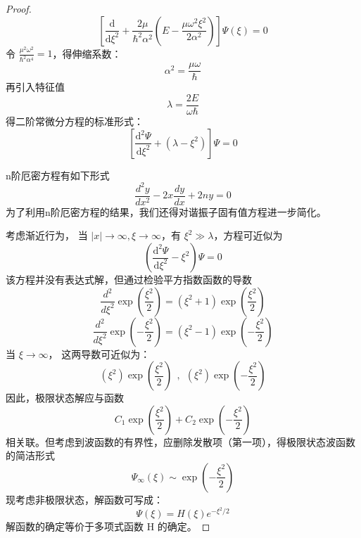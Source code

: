 \begin{proof}
\begin{equation*}
	\left[ \frac{\mathrm{d}}{\mathrm{d} \xi ^2}  + \frac{2\mu}{\hbar ^2 \alpha ^2 } (E- \frac{\mu \omega ^2 \xi ^2}{2 \alpha ^2}  ) \right] \Psi(\xi) =0
\end{equation*}
令 $\frac{\mu ^2 \omega ^2 }{\hbar ^2 \alpha ^ 4} =1$，得伸缩系数：\\
\begin{equation*}
	 \alpha ^2= \frac{\mu\omega}{\hbar}
\end{equation*}
再引入特征值\\
\begin{equation*}
\lambda = \frac{2E}{\omega \hbar}
\end{equation*}
得二阶常微分方程的标准形式：\\
\begin{equation*}
\left[ \frac{\mathrm{d} ^2\Psi}{\mathrm{d} \xi^2} + \left( \lambda - \xi^2 \right) \right] \Psi=0
\end{equation*}
\begin{remark}
n阶厄密方程有如下形式\\
	\begin{equation*}
	\frac{d^2 y}{d x^2} -2x \frac{d y}{d x} +2n y =0 
    \end{equation*}     
为了利用n阶厄密方程的结果，我们还得对谐振子固有值方程进一步简化。\\
\end{remark}
考虑渐近行为， 当 $ |x| \to \infty,  \xi \to \infty$，有 $ \xi ^2  \gg  \lambda $，方程可近似为 \\
\begin{equation*}
	\left(\frac{\mathrm{d} ^2\Psi}{\mathrm{d} \xi^2} - \xi^2 \right) \Psi=0
\end{equation*}
该方程并没有表达式解，但通过检验平方指数函数的导数\\
\begin{equation*}
	\frac{d^2 }{d \xi ^2} \exp(\frac{\xi ^2}{2}) =(\xi ^2 +1)  \exp(\frac{\xi ^2}{2}) 
\end{equation*}    
\begin{equation*}
	\frac{d^2 }{d \xi ^2} \exp( - \frac{\xi ^2}{2}) =(\xi ^2 -1)  \exp( - \frac{\xi ^2}{2}) 
\end{equation*}     
当 $ \xi \to \infty$， 这两导数可近似为：\\
\begin{equation*}
(\xi ^2 )  \exp( \frac{\xi ^2}{2}) ~~, ~~ (\xi ^2 )  \exp( - \frac{\xi ^2}{2}) 
\end{equation*}     
因此，极限状态解应与函数
\begin{equation*}
	C_1  \exp( \frac{\xi ^2}{2}) + C_2   \exp( - \frac{\xi ^2}{2})  
\end{equation*}     
相关联。但考虑到波函数的有界性，应删除发散项（第一项），得极限状态波函数的简洁形式
\begin{equation*}
\Psi_\infty (\xi)  \sim \exp( - \frac{\xi ^2}{2})  
\end{equation*}    
现考虑非极限状态，解函数可写成： 
\begin{equation*}
\Psi(\xi) = H(\xi) e^{-\xi^2/2 }  
\end{equation*}   
解函数的确定等价于多项式函数 H 的确定。


\end{proof}
